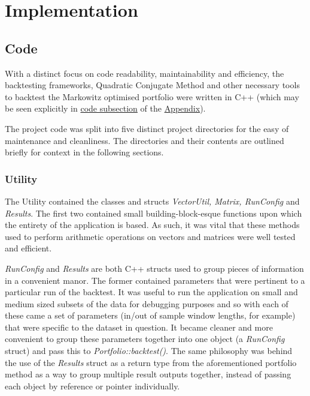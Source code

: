 \documentclass{article}
\begin{document}
\section{Implementation}
\label{sec:implementation}

\subsection{Code}
\label{sec:implementation_code}


With a distinct focus on code readability, maintainability and efficiency, the backtesting frameworks, Quadratic Conjugate Method and other necessary tools to backtest the Markowitz optimised portfolio were written in C++ (which may be seen explicitly in \hyperref[sec:code]{code subsection} of the \hyperref[sec:appendix]{Appendix}).


The project code was split into five distinct project directories for the easy of maintenance and cleanliness. The directories and their contents are outlined briefly for context in the following sections.

\subsubsection{Utility}
\label{sec:utility}

The Utility contained the classes and structs \textit{VectorUtil, Matrix, RunConfig} and \textit{Results}. 
The first two contained small building-block-esque functions upon which the entirety of the application is based. As such, it was vital that these methods used to perform arithmetic operations on vectors and matrices were well tested and efficient.

\textit{RunConfig}  and \textit{Results} are both C++ structs used to group pieces of information in a convenient manor. The former contained parameters that were pertinent to a particular run of the backtest. It was useful to run the application on small and medium sized subsets of the data for debugging purposes and so with each of these came a set of parameters (in/out of sample window lengths, for example) that were specific to the dataset in question. It became cleaner and more convenient to group these parameters together into one object (a \textit{RunConfig} struct) and pass this to \textit{Portfolio::backtest()}.  
The same philosophy was behind the use of the \textit{Results} struct as a return type from the aforementioned portfolio method as a way to group multiple result outputs together, instead of passing each object by reference or pointer individually. 
\end{document}
